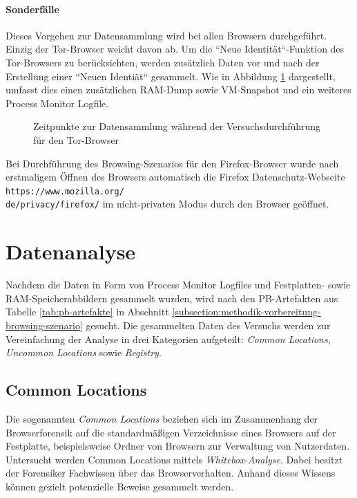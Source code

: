 \paragraph*{Sonderfälle}
Dieses Vorgehen zur Datensammlung wird bei allen Browsern durchgeführt. Einzig der Tor-Browser weicht davon ab. Um die ``Neue Identität``-Funktion des Tor-Browsers zu berücksichten, werden zusätzlich Daten vor und nach der Erstellung einer ``Neuen Identiät`` gesammelt. Wie in Abbildung \ref{img:zeitpunkte-datensammlung-tor} dargestellt, umfasst dies einen zusätzlichen RAM-Dump sowie VM-Snapshot und ein weiteres Process Monitor Logfile.
\begin{figure}[h!]
	\centering
	\small
	\centerline{\resizebox{\linewidth}{!}{}}
	\caption{Zeitpunkte zur Datensammlung während der Versuchsdurchführung für den Tor-Browser}
	\label{img:zeitpunkte-datensammlung-tor}
\end{figure}

Bei Durchführung des Browsing-Szenarios für den Firefox-Browser wurde nach erstmaligem Öffnen des Browsers automatisch die Firefox Datenschutz-Webseite \texttt{https://www.mozilla.org/\\
de/privacy/firefox/} im nicht-privaten Modus durch den Browser geöffnet. 

\section{Datenanalyse}
\label{section:methodik-datenanalyse}
Nachdem die Daten in Form von Process Monitor Logfiles und Festplatten- sowie RAM-Speicherabbildern gesammelt wurden, wird nach den PB-Artefakten aus Tabelle \ref{tab:pb-artefakte} in Abschnitt \ref{subsection:methodik-vorbereitung-browsing-szenario} gesucht. 
Die gesammelten Daten des Versuchs werden zur Vereinfachung der Analyse in drei Kategorien aufgeteilt: \textit{Common Locations}, \textit{Uncommon Locations} sowie \textit{Registry}.

\subsection{Common Locations}
\label{subsection:methodik-datenanalyse-commonlocations}
Die sogenannten \textit{Common Locations} beziehen sich im Zusammenhang der Browserforensik auf die standardmäßigen Verzeichnisse eines Browsers auf der Festplatte, beispielsweise Ordner von Browsern zur Verwaltung von Nutzerdaten.
Untersucht werden Common Locations mittels \textit{Whitebox-Analyse}. Dabei besitzt der Forensiker Fachwissen über das Browserverhalten. Anhand dieses Wissens können gezielt potenzielle Beweise gesammelt werden. \cite{Bonetti.2014}

